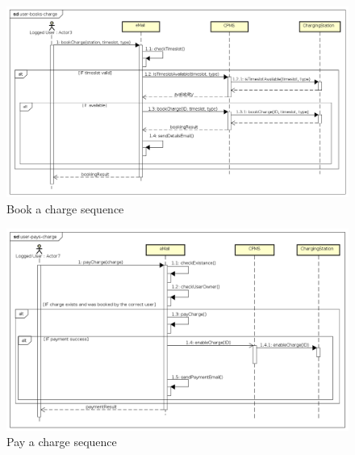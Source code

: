 \begin{figure}[!h]
    \begin{center}
        \includegraphics[keepaspectratio, width=16cm]{Sequence/user-books-charge.png}
        \caption{Book a charge sequence}
    \end{center}
\end{figure}
\begin{figure}[!h]
    \begin{center}
        \includegraphics[keepaspectratio, width=16cm]{Sequence/user-pays-charge.png}
        \caption{Pay a charge sequence}
    \end{center}
\end{figure}
